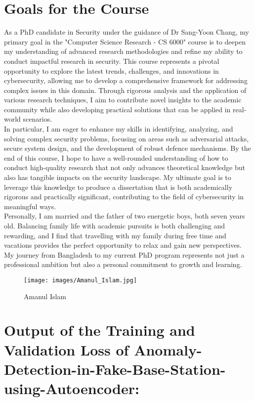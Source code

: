 \section{Goals for the Course}

As a PhD candidate in Security under the guidance of Dr Sang-Yoon Chang, my primary goal in the "Computer Science Research - CS 6000" course is to deepen my understanding of advanced research methodologies and refine my ability to conduct impactful research in security. This course represents a pivotal opportunity to explore the latest trends, challenges, and innovations in cybersecurity, allowing me to develop a comprehensive framework for addressing complex issues in this domain. Through rigorous analysis and the application of various research techniques, I aim to contribute novel insights to the academic community while also developing practical solutions that can be applied in real-world scenarios.\\

In particular, I am eager to enhance my skills in identifying, analyzing, and solving complex security problems, focusing on areas such as adversarial attacks, secure system design, and the development of robust defence mechanisms. By the end of this course, I hope to have a well-rounded understanding of how to conduct high-quality research that not only advances theoretical knowledge but also has tangible impacts on the security landscape. My ultimate goal is to leverage this knowledge to produce a dissertation that is both academically rigorous and practically significant, contributing to the field of cybersecurity in meaningful ways.\\

Personally, I am married and the father of two energetic boys, both seven years old. Balancing family life with academic pursuits is both challenging and rewarding, and I find that travelling with my family during free time and vacations provides the perfect opportunity to relax and gain new perspectives. My journey from Bangladesh to my current PhD program represents not just a professional ambition but also a personal commitment to growth and learning.

\begin{figure}[h!]
\centering
\texttt{[image: images/Amanul\_Islam.jpg]}
\caption{Amanul Islam}
\label{fig:myphoto}
\end{figure}


\section*{Output of the Training and Validation Loss of Anomaly-Detection-in-Fake-Base-Station-using-Autoencoder: }

